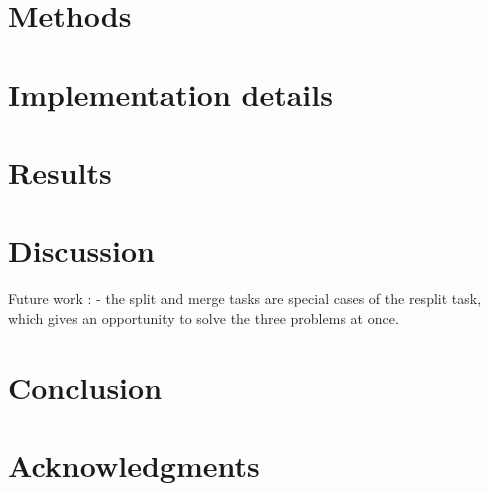 \documentclass[conference]{IEEEtran}
\begin{document}
\section{Methods}

\section{Implementation details}

\section{Results}

\section{Discussion}

Future work :
- the split and merge tasks
are special cases of the resplit task, which gives an opportunity to solve
the three problems at once.

\section{Conclusion}

\section{Acknowledgments}



\end{document}
